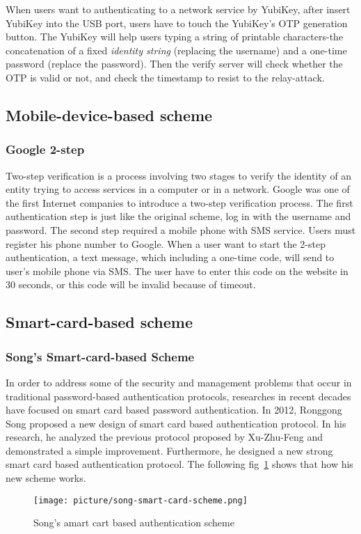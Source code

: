\begin{CJK}{Bg5}{bsmi}
When users want to authenticating to a network service by YubiKey, after insert YubiKey into the USB port, users have to touch the YubiKey's OTP generation button. The YubiKey will help users typing a string of printable characters-the concatenation of a fixed \emph{identity string} (replacing the username) and a one-time password (replace the password). Then the verify server will check whether the OTP is valid or not, and check the timestamp to resist to the relay-attack.

\subsection{Mobile-device-based scheme}

\subsubsection{Google 2-step}

Two-step verification is a process involving two stages to verify the identity of an entity trying to access services in a computer or in a network. Google was one of the first Internet companies to introduce a two-step verification process\cite{google-2-step}. The first authentication step is just like the original scheme, log in with the username and password. The second step required a mobile phone with SMS service. Users must register his phone number to Google. When a user want to start the 2-step authentication, a text message, which including a one-time code, will send to user's mobile phone via SMS. The user have to enter this code on the website in 30 seconds, or this code will be invalid because of timeout.

\subsection{Smart-card-based scheme}

\subsubsection{Song's Smart-card-based Scheme}

In order to address some of the security and management problems that occur in traditional password-based authentication protocols, researches in recent decades have focused on smart card based password authentication. In 2012, Ronggong Song proposed a new design of smart card based authentication protocol\cite{smart-card}. In his research, he analyzed the previous protocol proposed by Xu-Zhu-Feng and demonstrated a simple improvement. Furthermore, he designed a new strong smart card based authentication protocol. The following fig~\ref{fig:song-smard-card-scheme} shows that how his new scheme works.

\begin{figure}
\centering
\texttt{[image: picture/song-smart-card-scheme.png]}
\caption{Song's amart cart based authentication scheme}
\label{fig:song-smard-card-scheme}
\end{figure}
\end{CJK}